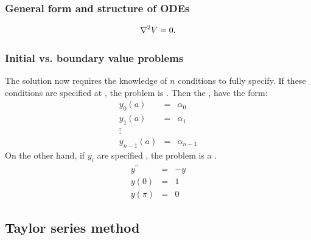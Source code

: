 \documentclass[hyperref={colorlinks=true}]{beamer}
\begin{document}
\begin{frame}%
  \frametitle{General form and structure of ODEs}

  \begin{equation}
    \nabla^{2} V = 0.
  \end{equation}

\end{frame}


\begin{frame}%
  \frametitle{Initial vs. boundary value problems}

  The solution now requires the knowledge of $n$ conditions to fully specify. If these conditions are specified at , the problem is . Then the , have the form:
  \begin{eqnarray}
    y_0(a) &=& \alpha_0 \nonumber\\
    y_1(a) &=& \alpha_1 \nonumber\\
    \vdots \nonumber \\
    y_{n-1}(a) &=& \alpha_{n-1} \nonumber
  \end{eqnarray}
  On the other hand, if $y_i$ are specified \alertbf, the problem is a .
  \begin{eqnarray}
    y^{\prime\prime} &=& -y \nonumber\\
    y(0)   &=& 1 \nonumber\\
    y(\pi) &=& 0 \nonumber
  \end{eqnarray}

\end{frame}

\subsection[Taylor series method]{Taylor series method}
\end{document}
